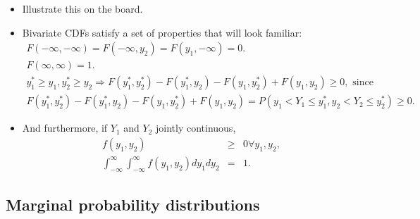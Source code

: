 \documentclass[11pt]{article}
\begin{document}
\begin{itemize}
\item Illustrate this on the board.

\item Bivariate CDFs satisfy a set of properties that will look familiar:%
\begin{multline*}
F(-\infty ,-\infty )=F(-\infty ,y_{2})=F(y_{1},-\infty )=0. \\
F(\infty ,\infty )=1. \\
y_{1}^{\ast }\geq y_{1},y_{2}^{\ast }\geq y_{2}\Rightarrow F(y_{1}^{\ast
},y_{2}^{\ast })-F(y_{1}^{\ast },y_{2}^{{}})-F(y_{1}^{{}},y_{2}^{\ast
})+F(y_{1}^{{}},y_{2}^{{}})\geq 0,\text{ since} \\
F(y_{1}^{\ast },y_{2}^{\ast })-F(y_{1}^{\ast
},y_{2}^{{}})-F(y_{1}^{{}},y_{2}^{\ast
})+F(y_{1}^{{}},y_{2}^{{}})=P(y_{1}^{{}}<Y_{1}\leq y_{1}^{\ast
},y_{2}^{{}}<Y_{2}\leq y_{2}^{\ast })\geq 0.
\end{multline*}

\item And furthermore, if $Y_{1}$ and $Y_{2}$ jointly continuous,%
\begin{eqnarray*}
f(y_{1},y_{2}) &\geq &0\forall y_{1},y_{2}, \\
\int_{-\infty }^{\infty }\int_{-\infty }^{\infty }f(y_{1},y_{2})dy_{1}dy_{2}
&=&1.
\end{eqnarray*}
\end{itemize}

\subsection{Marginal probability distributions}
\end{document}
